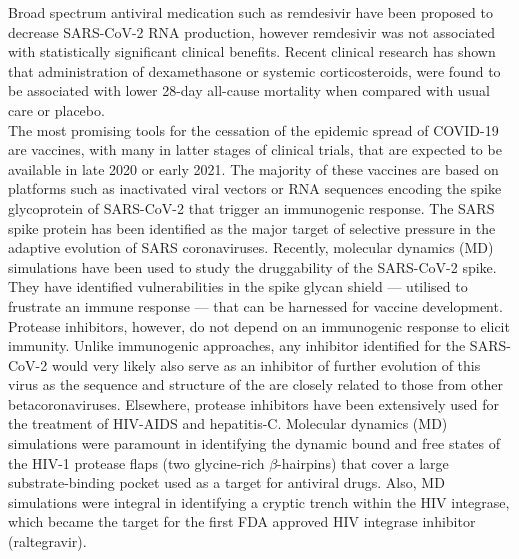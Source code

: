 Broad spectrum antiviral medication such as remdesivir have been proposed to decrease SARS-CoV-2 RNA production, however remdesivir was not associated with statistically significant clinical benefits.\cite{wang2020} Recent clinical research has shown that administration of dexamethasone\cite{dexamethasone} or systemic corticosteroids,\cite{steroids} were found to be associated with lower 28-day all-cause mortality when compared with usual care or placebo. \\

The most promising tools for the cessation of the epidemic spread of COVID-19 are vaccines, with many in latter stages of clinical trials, that are expected to be available in late 2020 or early 2021.\cite{world2020draft} The majority of these vaccines are based on platforms such as inactivated viral vectors or RNA sequences encoding the spike glycoprotein of SARS-CoV-2 that trigger an immunogenic response. The SARS spike protein has been identified as the major target of selective pressure in the adaptive evolution of SARS coronaviruses.\cite{zhang2006adaptive} Recently, molecular dynamics (MD) simulations have been used to study the druggability of the SARS-CoV-2 spike.\cite{RommieCasalino} They have identified vulnerabilities in the spike glycan shield --- utilised to frustrate an immune response --- that can be harnessed for vaccine development.\\

Protease inhibitors, however, do not depend on an immunogenic response to elicit immunity. Unlike immunogenic approaches, any inhibitor identified for the SARS-CoV-2  would very likely also serve as an inhibitor of further evolution of this virus as the sequence and structure of the  are closely related to those from other betacoronaviruses.\cite{ullrich2020sars} Elsewhere, protease inhibitors have been extensively used for the treatment of HIV-AIDS\cite{durrant2011molecular,deeks1999hiv} and hepatitis-C\cite{lamarre2003ns3}. Molecular dynamics (MD) simulations were paramount in identifying the dynamic bound and free states of the HIV-1 protease flaps (two glycine-rich $\beta$-hairpins) that cover a large substrate-binding pocket used as a target for antiviral drugs.\cite{york1993molecular} Also, MD simulations were integral in identifying a cryptic trench within the HIV integrase, which became the target for the first FDA approved HIV integrase inhibitor (raltegravir).\cite{schames2004discovery,durrant2011molecular}\\

